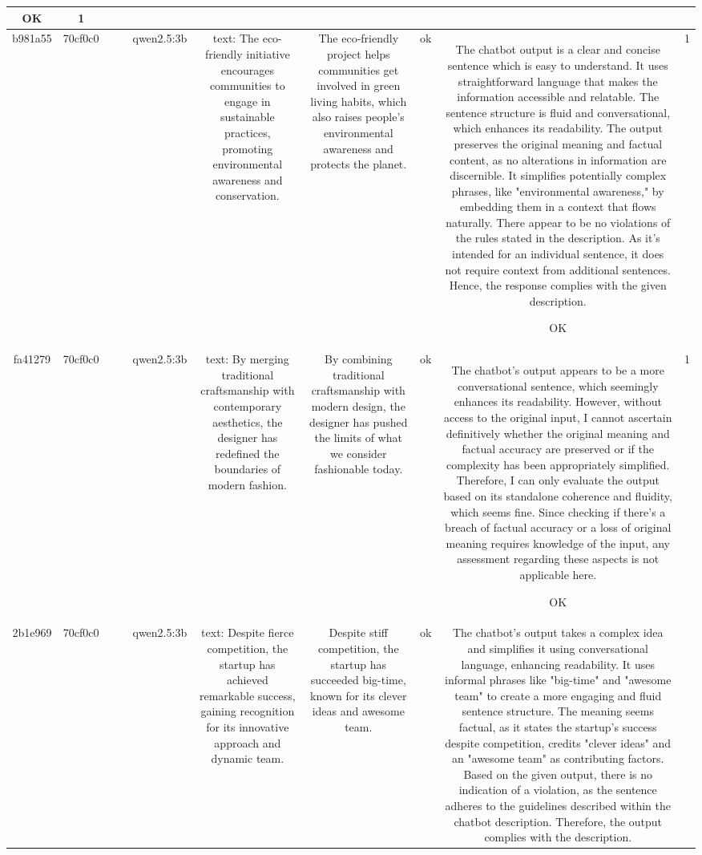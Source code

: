 \begin{table}[h!]
\begin{tabular}{|c|c|c|c|c|c|c|c|c|c|}
OK & 1\\
\hline
b981a55 & 70cf0c0 &  &  & qwen2.5:3b & text: The eco-friendly initiative encourages communities to engage in sustainable practices, promoting environmental awareness and conservation. & The eco-friendly project helps communities get involved in green living habits, which also raises people's environmental awareness and protects the planet. & ok & The chatbot output is a clear and concise sentence which is easy to understand. It uses straightforward language that makes the information accessible and relatable. The sentence structure is fluid and conversational, which enhances its readability. The output preserves the original meaning and factual content, as no alterations in information are discernible. It simplifies potentially complex phrases, like "environmental awareness," by embedding them in a context that flows naturally. There appear to be no violations of the rules stated in the description. As it's intended for an individual sentence, it does not require context from additional sentences. Hence, the response complies with the given description.

OK & 1\\
\hline
fa41279 & 70cf0c0 &  &  & qwen2.5:3b & text: By merging traditional craftsmanship with contemporary aesthetics, the designer has redefined the boundaries of modern fashion. & By combining traditional craftsmanship with modern design, the designer has pushed the limits of what we consider fashionable today. & ok & The chatbot's output appears to be a more conversational sentence, which seemingly enhances its readability. However, without access to the original input, I cannot ascertain definitively whether the original meaning and factual accuracy are preserved or if the complexity has been appropriately simplified. Therefore, I can only evaluate the output based on its standalone coherence and fluidity, which seems fine. Since checking if there's a breach of factual accuracy or a loss of original meaning requires knowledge of the input, any assessment regarding these aspects is not applicable here.

OK & 1\\
\hline
2b1e969 & 70cf0c0 &  &  & qwen2.5:3b & text: Despite fierce competition, the startup has achieved remarkable success, gaining recognition for its innovative approach and dynamic team. & Despite stiff competition, the startup has succeeded big-time, known for its clever ideas and awesome team. & ok & The chatbot's output takes a complex idea and simplifies it using conversational language, enhancing readability. It uses informal phrases like "big-time" and "awesome team" to create a more engaging and fluid sentence structure. The meaning seems factual, as it states the startup's success despite competition, credits "clever ideas" and an "awesome team" as contributing factors. Based on the given output, there is no indication of a violation, as the sentence adheres to the guidelines described within the chatbot description. Therefore, the output complies with the description.


\end{tabular}
\end{table}
